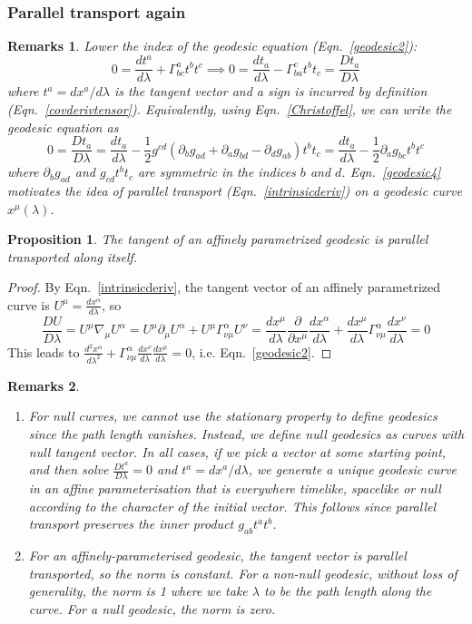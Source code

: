 \documentclass[a4paper]{article}
\newtheorem{remarks}{Remarks}[section]
\theoremstyle{new}
\newtheorem{prop}{Proposition}[section]
\begin{document}
\subsubsection*{Parallel transport again}
\begin{remarks}
Lower the index of the geodesic equation (Eqn.~\ref{geodesic2}):
$$0=\frac{dt^a}{d\lambda}+\Gamma^a_{bc}t^bt^c\implies 0=\frac{dt_a}{d\lambda}-\Gamma_{ba}^ct^bt_c=\frac{Dt_a}{D\lambda}$$
where $t^a=dx^a/d\lambda$ is the tangent vector and a sign is incurred by definition (Eqn.~\ref{covderivtensor}). Equivalently, using Eqn.~\ref{Christoffel}, we can write the geodesic equation as
\begin{equation}
0=\frac{Dt_a}{D\lambda}=\frac{dt_a}{d\lambda}-\frac{1}{2}g^{cd}(\partial_bg_{ad}+\partial_ag_{bd}-\partial_dg_{ab})t^bt_c=\frac{dt_a}{d\lambda}-\frac{1}{2}\partial_ag_{bc}t^bt^c\label{geodesic4}
\end{equation}
where $\partial_bg_{ad}$ and $g_{cd}t^bt_c$ are symmetric in the indices $b$ and $d$. Eqn.~\ref{geodesic4} motivates the idea of parallel transport (Eqn.~\ref{intrinsicderiv}) on a geodesic curve $x^\mu(\lambda)$. 
\end{remarks}
\begin{prop}
The tangent of an affinely parametrized geodesic is parallel transported along itself.
\end{prop}
\begin{proof}
By Eqn.~\ref{intrinsicderiv}, the tangent vector of an affinely parametrized curve is $U^\mu=\frac{dx^\alpha}{d\lambda}$, so
$$\frac{DU}{D\lambda}=U^\mu\nabla_\mu U^\alpha=U^\mu\partial_\mu U^\alpha+U^\mu\Gamma_{\nu\mu}^\alpha U^\nu=\frac{dx^\mu}{d\lambda}\frac{\partial}{\partial x^\mu}\frac{dx^\alpha}{d\lambda}+\frac{dx^\mu}{d\lambda}\Gamma_{\nu\mu}^\alpha\frac{dx^\nu}{d\lambda}=0$$
This leads to $\frac{d^2x^\alpha}{d\lambda^2}+\Gamma_{\nu\mu}^\alpha\frac{dx^\nu}{d\lambda}\frac{dx^\mu}{d\lambda}=0$, i.e. Eqn.~\ref{geodesic2}.
\end{proof}
\begin{remarks}\leavevmode
\begin{enumerate}
    \item For null curves, we cannot use the stationary property to define geodesics since the path length vanishes. Instead, we define null geodesics as curves with null tangent vector. In all cases, if we pick a vector at some starting point, and then solve $\frac{Dt^a}{D\lambda}=0$ and $t^a=dx^a/d\lambda$, we generate a unique geodesic curve in an affine parameterisation that is everywhere timelike, spacelike or null according to the character of the initial vector. This follows since parallel transport preserves the inner product $g_{ab}t^at^b$.
    \item For an affinely-parameterised geodesic, the tangent vector is parallel transported, so the norm is constant. For a non-null geodesic, without loss of generality, the norm is 1 where we take $\lambda$ to be the path length along the curve. For a null geodesic, the norm is zero.
\end{enumerate}
\end{remarks}
\end{document}
